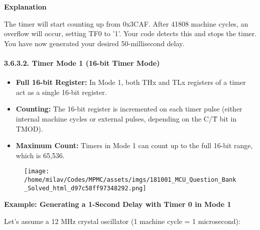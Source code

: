 \documentclass[
]{article}
\begin{document}
\textbf{Explanation}

The timer will start counting up from 0x3CAF. After 41808 machine
cycles, an overflow will occur, setting TF0 to '1'. Your code detects
this and stops the timer. You have now generated your desired
50-millisecond delay.

\hypertarget{3632-timer-mode-1-16-bit-timer-mode}{%
\paragraph{3.6.3.2. Timer Mode 1 (16-bit Timer
Mode)}\label{3632-timer-mode-1-16-bit-timer-mode}}

\begin{itemize}
\item
  \textbf{Full 16-bit Register:} In Mode 1, both THx and TLx registers
  of a timer act as a single 16-bit register.
\item
  \textbf{Counting:} The 16-bit register is incremented on each timer
  pulse (either internal machine cycles or external pulses, depending on
  the C/T̄ bit in TMOD).
\item
  \textbf{Maximum Count:} Timers in Mode 1 can count up to the full
  16-bit range, which is 65,536.
\end{itemize}

\begin{figure}
\centering
\texttt{[image: /home/milav/Codes/MPMC/assets/imgs/181001\_MCU\_Question\_Bank\_Solved\_html\_d97c58ff97348292.png]}
\caption{}
\end{figure}

\textbf{Example: Generating a 1-Second Delay with Timer 0 in Mode 1}

Let's assume a 12 MHz crystal oscillator (1 machine cycle = 1
microsecond):
\end{document}
